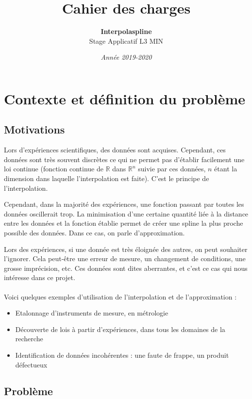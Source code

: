 \documentclass[a4paper,12pt]{article}
\title{Cahier des charges}
\author{\textbf{Interpolaspline}\\Stage Applicatif L3 MIN}
\date{\emph{Année 2019-2020}}
\newcommand{\IKex}[2]{\mathbb{#1}^{#2}}
\newcommand{\IK}[1]{\mathbb{#1}}
\newcommand{\IRex}[1]{\IKex{R}{#1}}
\newcommand{\IR}{\IK{R}}
\begin{document}
\maketitle
\tableofcontents

\newpage

\section{Contexte et définition du problème}

\subsection{Motivations}

Lors d'expériences scientifiques, des données sont acquises. Cependant, ces données sont très souvent discrètes ce qui ne permet pas d'établir facilement une loi continue (fonction continue de $\IR$ dans $\IRex{n}$ suivie par ces données, $n$ étant la dimension dans laquelle l'interpolation est faite). C'est le principe de l'interpolation.

Cependant, dans la majorité des expériences, une fonction passant par toutes les données oscillerait trop. La minimisation d'une certaine quantité liée à la distance entre les données et la fonction établie permet de créer une spline la plus proche possible des données. Dans ce cas, on parle d'approximation.

Lors des expériences, si une donnée est très éloignée des autres, on peut souhaiter l'ignorer. Cela peut-être une erreur de mesure, un changement de conditions, une grosse imprécision, etc. Ces données sont dites aberrantes, et c'est ce cas qui nous intéresse dans ce projet.
\\ \\
Voici quelques exemples d'utilisation de l'interpolation et de l'approximation :
\begin{itemize}
\item Etalonnage d'instruments de mesure, en métrologie
\item Découverte de lois à partir d'expériences, dans tous les domaines de la recherche
\item Identification de données incohérentes : une faute de frappe, un produit défectueux
\end{itemize}

\subsection{Problème}
\end{document}
